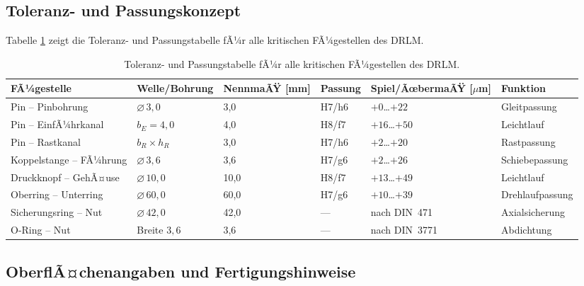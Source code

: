 ﻿\documentclass[12pt, a4paper]{article}
\theoremstyle{remark}
\begin{document}
\subsection{Toleranz- und Passungskonzept}
Tabelle \ref{tab:toleranzen} zeigt die Toleranz- und Passungstabelle fÃ¼r alle kritischen FÃ¼gestellen des DRLM.
\begin{table}
  \centering
  \caption{Toleranz- und Passungstabelle fÃ¼r alle kritischen FÃ¼gestellen des DRLM.}
  \label{tab:toleranzen}
  \renewcommand{\arraystretch}{1.35}
  \begin{tabular}{llllll}
    \toprule
    \textbf{FÃ¼gestelle} & \textbf{Welle/Bohrung} & \textbf{NennmaÃŸ [mm]} &
    \textbf{Passung} & \textbf{Spiel/ÃœbermaÃŸ [$\mu$m]} & \textbf{Funktion} \\
    \midrule
    Pin -- Pinbohrung         & $\varnothing\,3{,}0$ & 3{,}0  & H7/h6 & $+0$\ldots$+22$   & Gleitpassung \\
    Pin -- EinfÃ¼hrkanal       & $b_E = 4{,}0$        & 4{,}0  & H8/f7 & $+16$\ldots$+50$  & Leichtlauf \\
    Pin -- Rastkanal          & $b_R \times h_R$     & 3{,}0  & H7/h6 & $+2$\ldots$+20$   & Rastpassung \\
    Koppelstange -- FÃ¼hrung   & $\varnothing\,3{,}6$ & 3{,}6  & H7/g6 & $+2$\ldots$+26$   & Schiebepassung \\
    Druckknopf -- GehÃ¤use     & $\varnothing\,10{,}0$& 10{,}0 & H8/f7 & $+13$\ldots$+49$  & Leichtlauf \\
    Oberring -- Unterring     & $\varnothing\,60{,}0$& 60{,}0 & H7/g6 & $+10$\ldots$+39$  & Drehlaufpassung \\
    Sicherungsring -- Nut     & $\varnothing\,42{,}0$& 42{,}0 & ---   & nach DIN~471       & Axialsicherung \\
    O-Ring -- Nut             & Breite $3{,}6$       & 3{,}6  & ---   & nach DIN~3771      & Abdichtung \\
    \bottomrule
  \end{tabular}
\end{table}

\subsection{OberflÃ¤chenangaben und Fertigungshinweise}
\end{document}

